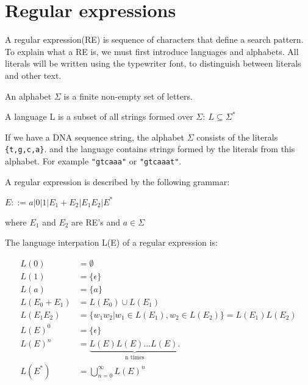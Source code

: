 \section{Regular expressions} 
A regular expression(RE) is sequence of characters that define a search pattern. To explain what a RE  is, we must first introduce languages and alphabets. All literals will be written using the typewriter font, to distinguish between literals and other text. 
\begin{mydef}\label{alph}
An alphabet $\Sigma$ is a finite non-empty set of letters.
\end{mydef}

\begin{mydef}\label{lang}
A language L is a subset of all strings formed over $\Sigma:~ L\subseteq \Sigma^*$
\end{mydef}

\begin{myex}\label{reex}
If we have a DNA sequence string, the alphabet $\Sigma$ consists of the literals {\tt\{t,g,c,a\}}. and the language contains strings formed by the literals from this alphabet. For example {\tt "gtcaaa"} or  {\tt "gtcaaat"}. 
\end{myex}


\begin{mydef}
A regular expression is described by the following grammar: \\
\begin{center}
$E::= a|0|1|E_1 + E_2 |E_1 E_2 | E^*$
\end{center}
where $E_1$ and $E_2$ are RE's and $a \in \Sigma$
\end{mydef}

\begin{mydef}\label{re}
The language interpation L(E) of a regular expression is: 
\begin{center}
\begin{align*}
L(0)           &= \emptyset\\
L(1)         &= \{\epsilon\} \\
L(a)     &= \{a\} \\
L(E_0 + E_1) &= L(E_0) \cup L(E_1) \\
L(E_1 E_2)   &= \{w_1w_2 | w_1 \in L(E_1),w_2 \in L(E_2)\}=L(E_1)L(E_2) \\
L(E)^0       &= \{\epsilon\}\\
L(E)^n       &= \underbrace{L(E)L(E)...L(E).}_\text{n times}\\
L(E^*)       &= \bigcup\limits_{n=0}^\infty L(E)^n 
\end{align*}
\end{center}
\cite[p.5 def. 3]{crash}
\end{mydef}

